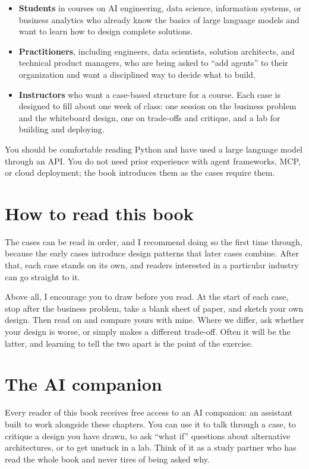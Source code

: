 \begin{itemize}
  \item \textbf{Students} in courses on AI engineering, data science, information
        systems, or business analytics who already know the basics of large
        language models and want to learn how to design complete solutions.
  \item \textbf{Practitioners}, including engineers, data scientists, solution
        architects, and technical product managers, who are being asked to
        ``add agents'' to their organization and want a disciplined way to
        decide what to build.
  \item \textbf{Instructors} who want a case-based structure for a course. Each
        case is designed to fill about one week of class: one session on the
        business problem and the whiteboard design, one on trade-offs and
        critique, and a lab for building and deploying.
\end{itemize}

You should be comfortable reading Python and have used a large language model
through an API. You do not need prior experience with agent frameworks, MCP, or
cloud deployment; the book introduces them as the cases require them.

\section*{How to read this book}

The cases can be read in order, and I recommend doing so the first time
through, because the early cases introduce design patterns that later cases
combine. After that, each case stands on its own, and readers interested in a
particular industry can go straight to it.

Above all, I encourage you to draw before you read. At the start of each case,
stop after the business problem, take a blank sheet of paper, and sketch your
own design. Then read on and compare yours with mine. Where we differ, ask
whether your design is worse, or simply makes a different trade-off. Often it
will be the latter, and learning to tell the two apart is the point of the
exercise.

\section*{The AI companion}

Every reader of this book receives free access to an AI companion: an assistant
built to work alongside these chapters. You can use it to talk through a case,
to critique a design you have drawn, to ask ``what if'' questions about
alternative architectures, or to get unstuck in a lab. Think of it as a study
partner who has read the whole book and never tires of being asked why.

